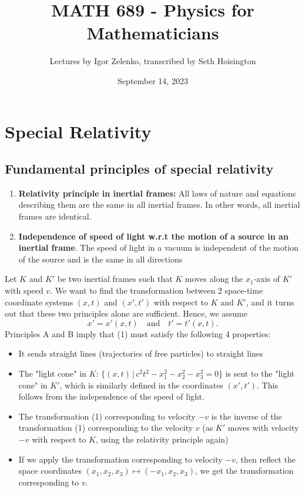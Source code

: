 \documentclass{article}
\title{MATH 689 - Physics for Mathematicians}
\author{Lectures by Igor Zelenko, transcribed by Seth Hoisington}
\date{September 14, 2023}
\begin{document}
\maketitle
\section*{Special Relativity}
\subsection*{Fundamental principles of special relativity}
\begin{enumerate}[label=\Alph*]
    \item \textbf{Relativity principle in inertial frames:} All laws of nature and equations describing them are the same in all inertial frames. In other words, all inertial frames are identical.
    \item \textbf{Independence of speed of light w.r.t the motion of a source in an inertial frame}. The speed of light in a vacuum is independent of the motion of the source and is the same in all directions
\end{enumerate}
Let $K$ and $K'$ be two inertial frames such that $K$ moves along the $x_1$-axis of $K'$ with speed $v$. We want to find the transformation between 2 space-time coordinate systems $(x,t)$ and $(x',t')$ with respect to $K$ and $K'$, and it turns out that these two principles alone are sufficient. Hence, we assume 
\begin{equation}
    x' = x'(x,t)\quad\text{and}\quad t' = t'(x,t).
\end{equation}
Principles A and B imply that (1) must satisfy the following 4 properties:
\begin{itemize}
    \item It sends straight lines (trajectories of free particles) to straight lines
    \item The "light cone" in $K$: $\{(x,t)\,|\, c^2t^2 - x_1^2 - x_2^2 - x_3^2 = 0\}$ is sent to the "light cone" in $K'$, which is similarly defined in the coordinates $(x',t')$. This follows from the independence of the speed of light.
    \item The transformation (1) corresponding to velocity $-v$ is the inverse of the transformation (1) corresponding to the velocity $v$ (as $K'$ moves with velocity $-v$ with respect to $K$, using the relativity principle again)
    \item If we apply the transformation corresponding to velocity $-v$, then reflect the space coordinates $(x_1,x_2,x_3)\mapsto (-x_1,x_2, x_3)$, we get the transformation corresponding to $v$.
\end{itemize}
\end{document}
